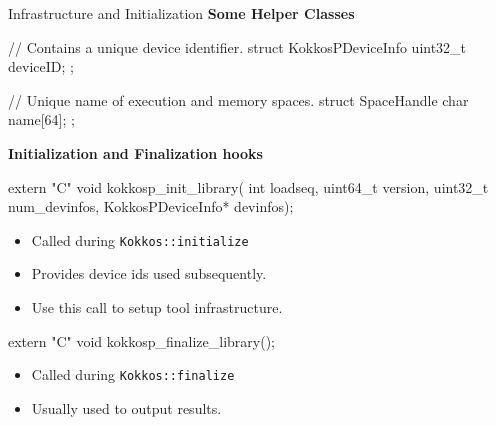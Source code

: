 
\begin{frame}[fragile]{Infrastructure and Initialization}
\textbf{Some Helper Classes}
\begin{code}
// Contains a unique device identifier.
struct KokkosPDeviceInfo { uint32_t deviceID; };

// Unique name of execution and memory spaces.
struct SpaceHandle { char name[64]; };
\end{code}

\pause
\textbf{Initialization and Finalization hooks}
\begin{code}[keywords={extern,void,int,uint64_t,uint32_t}]
extern "C" void kokkosp_init_library(
  int loadseq, uint64_t version, uint32_t num_devinfos,
  KokkosPDeviceInfo* devinfos);
\end{code}
\vspace{-15pt}
  \begin{itemize}
    \item Called during \texttt{Kokkos::initialize}
    \item Provides device ids used subsequently.
    \item Use this call to setup tool infrastructure.
  \end{itemize}
\begin{code}[keywords={extern,void,int,uint64_t,uint32_t}]
extern "C" void kokkosp_finalize_library();
\end{code}
\vspace{-15pt}
  \begin{itemize}
    \item Called during \texttt{Kokkos::finalize}
    \item Usually used to output results.
  \end{itemize}
\end{frame}


